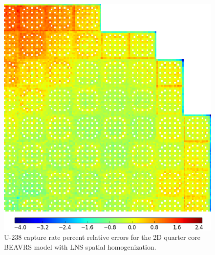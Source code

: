 \begin{figure}[h!]
\centering
\includegraphics[width=\linewidth]{figures/patterns/lns/full-core/capt-err-lns}
\vspace{2mm}
\caption[U-238 capture rate errors for BEAVRS]{U-238 capture rate percent relative errors for the 2D quarter core \ac{BEAVRS} model with \ac{LNS} spatial homogenization.}
\label{fig:chap9-full-core-capt-err-lns}
\end{figure}

\clearpage

